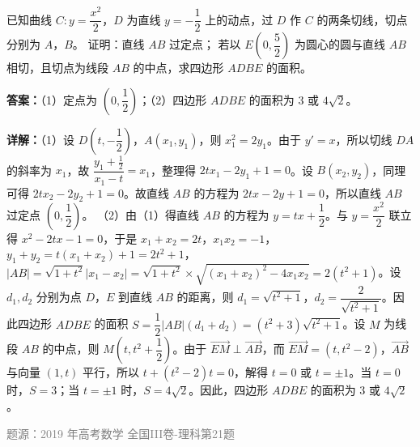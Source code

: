 \begin{question}
已知曲线 $C: y=\dfrac{x^2}{2}$，$D$ 为直线 $y=-\dfrac{1}{2}$ 上的动点，过 $D$ 作 $C$ 的两条切线，切点分别为 $A$，$B$。
证明：直线 $AB$ 过定点；
若以 $E\left(0,\dfrac{5}{2}\right)$ 为圆心的圆与直线 $AB$ 相切，且切点为线段 $AB$ 的中点，求四边形 $ADBE$ 的面积。
\begin{solution}
\textbf{答案：}（1）定点为 $\left(0,\dfrac{1}{2}\right)$；（2）四边形 $ADBE$ 的面积为 $3$ 或 $4\sqrt{2}$。

\textbf{详解：}（1）设 $D\left(t,-\dfrac{1}{2}\right)$，$A(x_1,y_1)$，则 $x_1^2=2y_1$。由于 $y'=x$，所以切线 $DA$ 的斜率为 $x_1$，故 $\dfrac{y_1+\frac{1}{2}}{x_1-t}=x_1$，整理得 $2tx_1-2y_1+1=0$。设 $B(x_2,y_2)$，同理可得 $2tx_2-2y_2+1=0$。故直线 $AB$ 的方程为 $2tx-2y+1=0$，所以直线 $AB$ 过定点 $\left(0,\dfrac{1}{2}\right)$。
（2）由（1）得直线 $AB$ 的方程为 $y=tx+\dfrac{1}{2}$。与 $y=\dfrac{x^2}{2}$ 联立得 $x^2-2tx-1=0$，于是 $x_1+x_2=2t$，$x_1x_2=-1$，$y_1+y_2=t(x_1+x_2)+1=2t^2+1$，$|AB|=\sqrt{1+t^2}|x_1-x_2|=\sqrt{1+t^2}\times\sqrt{(x_1+x_2)^2-4x_1x_2}=2(t^2+1)$。设 $d_1,d_2$ 分别为点 $D$，$E$ 到直线 $AB$ 的距离，则 $d_1=\sqrt{t^2+1}$，$d_2=\dfrac{2}{\sqrt{t^2+1}}$。因此四边形 $ADBE$ 的面积 $S=\dfrac{1}{2}|AB|(d_1+d_2)=(t^2+3)\sqrt{t^2+1}$。设 $M$ 为线段 $AB$ 的中点，则 $M\left(t,t^2+\dfrac{1}{2}\right)$。由于 $\overrightarrow{EM}\perp\overrightarrow{AB}$，而 $\overrightarrow{EM}=(t,t^2-2)$，$\overrightarrow{AB}$ 与向量 $(1,t)$ 平行，所以 $t+(t^2-2)t=0$，解得 $t=0$ 或 $t=\pm1$。当 $t=0$ 时，$S=3$；当 $t=\pm1$ 时，$S=4\sqrt{2}$。因此，四边形 $ADBE$ 的面积为 $3$ 或 $4\sqrt{2}$。

\textcolor{gray}{\footnotesize 题源：2019 年高考数学 全国III卷-理科第21题}
\end{solution}
\end{question}

